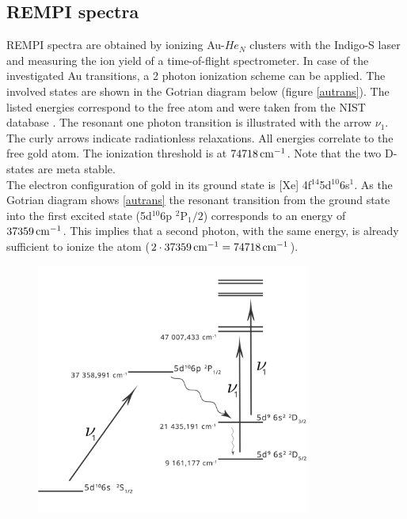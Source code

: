 \documentclass[parskip,12pt,headsepline,a4paper] {scrbook}
\begin{document}
\subsection{REMPI spectra}
\vspace{-1\baselineskip}
REMPI spectra are obtained by ionizing Au-$He_N$ clusters with the Indigo-S laser and measuring the ion yield of a time-of-flight spectrometer. In case of the investigated Au transitions, a 2 photon ionization scheme can be applied. The involved states are shown in the Gotrian diagram below (figure \ref{autrans}). The listed energies correspond to the free atom and were taken from the NIST database \cite{nist}. The resonant one photon transition is illustrated with the arrow $\nu_1$. The curly arrows indicate radiationless relaxations. All energies correlate to the free gold atom. The ionization threshold is at $\unit[74 718]{cm^{-1}}$. Note that the two D-states are meta stable. \\
The electron configuration of gold in its ground state is [Xe] 4f$^{14}$5d$^{10}$6s$^1$. As the Gotrian diagram shows \ref{autrans} the resonant transition from the ground state into the first excited state (5d$^{10}$6p $^2$P$_1/2$) corresponds to an energy of $\unit[37 359]{cm^{-1}}$. This implies that a second photon, with the same energy, is already sufficient to ionize the atom ($2 \cdot \unit[37 359]{cm^{-1}} = \unit[74 718]{cm^{-1}}$).

\begin{figure}[ht]
\centerline{
\includegraphics[width=9cm]{./results/au_trans.jpg}}
\end{figure}
\end{document}
